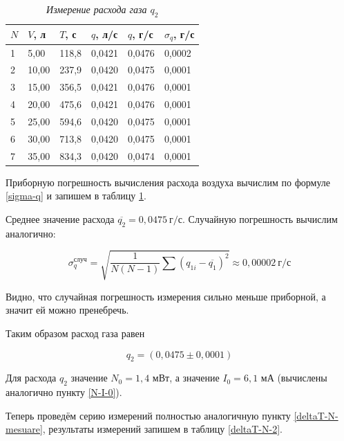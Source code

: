 \documentclass[a4paper,12pt]{article}
\begin{document}
\begin{table}[!h]
    \centering
    \begin{tabular}{|l|l|l|l|l|l|}
    \hline
        $N$ & $V$, л & $T$, с & $q$, л/с & $q$, г/с & $\sigma_q$, г/с \\ \hline
        1 & 5,00 & 118,8 & 0,0421 & 0,0476 & 0,0002 \\ \hline
        2 & 10,00 & 237,9 & 0,0420 & 0,0475 & 0,0001 \\ \hline
        3 & 15,00 & 356,5 & 0,0421 & 0,0476 & 0,0001 \\ \hline
        4 & 20,00 & 475,6 & 0,0421 & 0,0476 & 0,0001 \\ \hline
        5 & 25,00 & 594,6 & 0,0420 & 0,0475 & 0,0001 \\ \hline
        6 & 30,00 & 713,8 & 0,0420 & 0,0475 & 0,0001 \\ \hline
        7 & 35,00 & 834,3 & 0,0420 & 0,0474 & 0,0001 \\ \hline
    \end{tabular}\caption{\textit{Измерение расхода газа $q_2$}}\label{q2}
\end{table}

Приборную погрешность вычисления расхода воздуха вычислим по формуле \eqref{sigma-q} и запишем в таблицу \ref{q2}. 

Среднее значение расхода $\overline{q_2} = 0,0475 \ \text{г}/\text{с}$. Случайную погрешность вычислим аналогично:

\begin{equation}
    \sigma_q^\text{случ} = \sqrt{\frac{1}{N  (N-1)}\sum(q_{1i}-\overline{q_1})^2} \approx 0,00002 \ \text{г}/\text{с}
\end{equation}

Видно, что случайная погрешность измерения сильно меньше приборной, а значит ей можно пренебречь.

Таким образом расход газа равен

\begin{equation}
    q_2 = (0,0475 \pm 0,0001)
\end{equation}

Для расхода $q_2$ значение $N_0 = 1,4$ мВт, а значение $I_0 = 6,1$ мА (вычислены аналогично пункту \ref{N-I-0}).

Теперь проведём серию измерений полностью аналогичную пункту \ref{deltaT-N-mesuare}, результаты измерений запишем в таблицу \ref{deltaT-N-2}.
\end{document}
